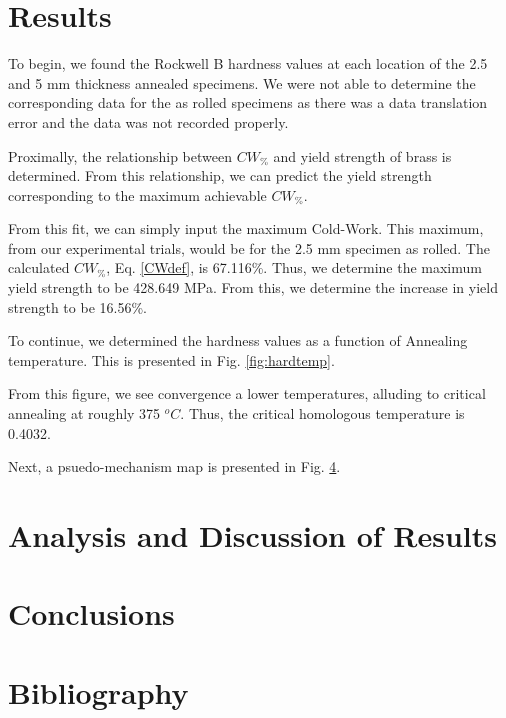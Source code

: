 \documentclass{article}
\begin{document}
\newpage
\section{Results}
To begin, we found the Rockwell B hardness values at each location of the 2.5 and 5 mm thickness annealed specimens. We were not able to determine the corresponding data for the as rolled specimens as there was a data translation error and the data was not recorded properly. 

Proximally, the relationship between $CW_{\%}$ and yield strength of brass is determined. From this relationship, we can predict the yield strength corresponding to the maximum achievable $CW_{\%}$. 


From this fit, we can simply input the maximum Cold-Work. This maximum, from our experimental trials, would be for the 2.5 mm specimen as rolled. The calculated $CW_{\%}$, Eq. \ref{CWdef}, is 67.116\%. Thus, we determine the maximum yield strength to be 428.649 MPa. From this, we determine the increase in yield strength to be 16.56\%. 

To continue, we determined the hardness values as a function of Annealing temperature. This is presented in Fig. \ref{fig:hardtemp}.


From this figure, we see convergence a lower temperatures, alluding to critical annealing at roughly 375 $^oC$. Thus, the critical homologous temperature is 0.4032. 

Next, a psuedo-mechanism map is presented in Fig. \ref{}.

\Fig{}{}{}

\section{Analysis and Discussion of Results}

\section{Conclusions}

\section{Bibliography}
\printbibliography[heading=none]
\end{document}
